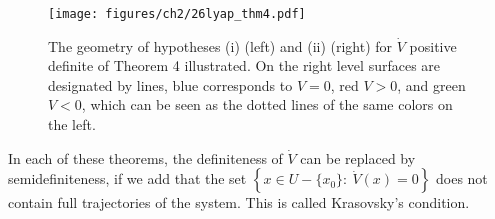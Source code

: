 \begin{figure}[h!]
	\centering
	\texttt{[image: figures/ch2/26lyap\_thm4.pdf]}
	\caption{The geometry of hypotheses (i) (left) and (ii) (right) for $\dot{V}$ positive definite of Theorem 4 illustrated. On the right level surfaces are designated by lines, blue corresponds to $V=0$, red $V>0$, and green $V<0$, which can be seen as the dotted lines of the same colors on the left.}
	\label{fig:lyap_thm4_hypos}
\end{figure}

\begin{remark}[]
	In each of these theorems, the definiteness of $ \dot{V}$ can be replaced by semidefiniteness, if we add that the set $\left\{x\in U-\{x_0\}:\ \dot{V}(x)=0 \right\}$ does not contain full trajectories of the system. This is called Krasovsky's condition.
\end{remark}

